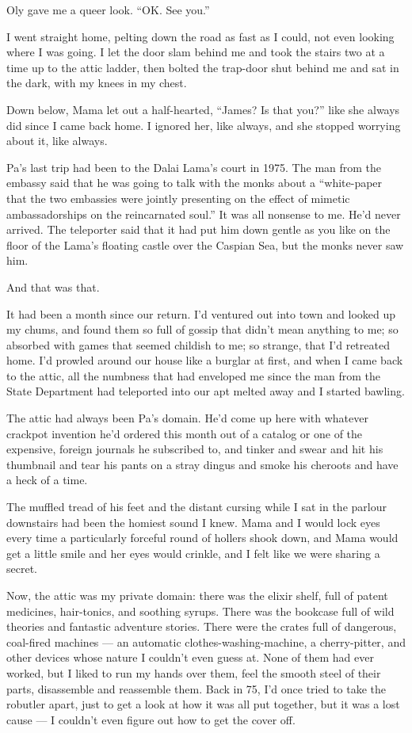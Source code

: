 Oly gave me a queer look. ``OK. See you.''

\tb

I went straight home, pelting down the road as fast as I could, not
even looking where I was going. I let the door slam behind me and
took the stairs two at a time up to the attic ladder, then bolted
the trap-door shut behind me and sat in the dark, with my knees in
my chest.

Down below, Mama let out a half-hearted, ``James? Is that you?''
like she always did since I came back home. I ignored her, like
always, and she stopped worrying about it, like always.

Pa's last trip had been to the Dalai Lama's court in 1975. The man
from the embassy said that he was going to talk with the monks
about a
``white-paper that the two embassies were jointly presenting on the effect of 
mimetic ambassadorships on the reincarnated soul.''
It was all nonsense to me. He'd never arrived. The teleporter said
that it had put him down gentle as you like on the floor of the
Lama's floating castle over the Caspian Sea, but the monks never
saw him.

And that was that.

It had been a month since our return. I'd ventured out into town
and looked up my chums, and found them so full of gossip that
didn't mean anything to me; so absorbed with games that seemed
childish to me; so strange, that I'd retreated home. I'd prowled
around our house like a burglar at first, and when I came back to
the attic, all the numbness that had enveloped me since the man
from the State Department had teleported into our apt melted away
and I started bawling.

The attic had always been Pa's domain. He'd come up here with
whatever crackpot invention he'd ordered this month out of a
catalog or one of the expensive, foreign journals he subscribed to,
and tinker and swear and hit his thumbnail and tear his pants on a
stray dingus and smoke his cheroots and have a heck of a time.

The muffled tread of his feet and the distant cursing while I sat
in the parlour downstairs had been the homiest sound I knew. Mama
and I would lock eyes every time a particularly forceful round of
hollers shook down, and Mama would get a little smile and her eyes
would crinkle, and I felt like we were sharing a secret.

Now, the attic was my private domain: there was the elixir shelf,
full of patent medicines, hair-tonics, and soothing syrups. There
was the bookcase full of wild theories and fantastic adventure
stories. There were the crates full of dangerous, coal-fired
machines --- an automatic clothes-washing-machine, a cherry-pitter,
and other devices whose nature I couldn't even guess at. None of
them had ever worked, but I liked to run my hands over them, feel
the smooth steel of their parts, disassemble and reassemble them.
Back in 75, I'd once tried to take the robutler apart, just to get
a look at how it was all put together, but it was a lost cause ---
I couldn't even figure out how to get the cover off.

